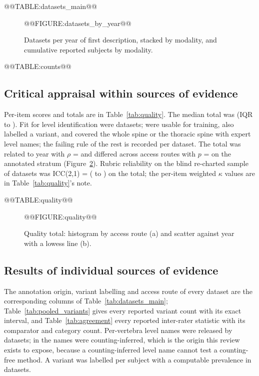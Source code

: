 \documentclass[11pt,a4paper]{article}
\newcommand{\tabref}[1]{Table~\ref{tab:#1}}
\newcommand{\figref}[1]{Figure~\ref{fig:#1}}
\begin{document}
@@TABLE:datasets_main@@

\begin{figure}[H]
\centering
@@FIGURE:datasets_by_year@@
\caption{Datasets per year of first description, stacked by modality, and cumulative reported subjects by modality.}\label{fig:years}
\end{figure}

@@TABLE:counts@@

\subsection{Critical appraisal within sources of evidence}\label{sec:appraisal_results}
Per-item scores and totals are in \tabref{quality}. The median total was \numQualityMedian{} (IQR \numQualityQOne{} to \numQualityQThree). Fit for level identification were \numwordFitLevelId{} datasets; \numwordUsableTraining{} were usable for training, \numwordFitVariant{} also labelled a variant, and \numwordFitStitching{} covered the whole spine or the thoracic spine with expert level names; the failing rule of the rest is recorded per dataset. The total was related to year with $\rho$ = \numRhoQualityYear{} and differed across access routes with $p$ = \numPKruskalRoute{} on the annotated stratum (\figref{quality}). Rubric reliability on the blind re-charted sample of \numReliabilitySample{} datasets was ICC(2,1) = \numICCTotal{} (\numICCTotalLow{} to \numICCTotalHigh) on the total; the per-item weighted $\kappa$ values are in \tabref{quality}'s note.

@@TABLE:quality@@

\begin{figure}[H]
\centering
@@FIGURE:quality@@
\caption{Quality total: histogram by access route (a) and scatter against year with a lowess line (b).}\label{fig:quality}
\end{figure}

\subsection{Results of individual sources of evidence}\label{sec:individual}
The annotation origin, variant labelling and access route of every dataset are the corresponding columns of \tabref{datasets_main}; \tabref{pooled_variants} gives every reported variant count with its exact interval, and \tabref{agreement} every reported inter-rater statistic with its comparator and category count. Per-vertebra level names were released by \numwordLevelNamesYes{} datasets; in \numwordCountingInferred{} the names were counting-inferred, which is the origin this review exists to expose, because a counting-inferred level name cannot test a counting-free method. A variant was labelled per subject with a computable prevalence in \numwordVariantExplicit{} datasets.
\end{document}

